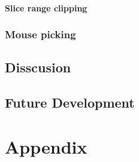 \documentclass[english, 11pt]{report}
\begin{document}
\subsubsection{Slice range clipping}
\subsection{Mouse picking}

\section{Disscusion}

\section{Future Development}

\chapter{Appendix}
\end{document}
